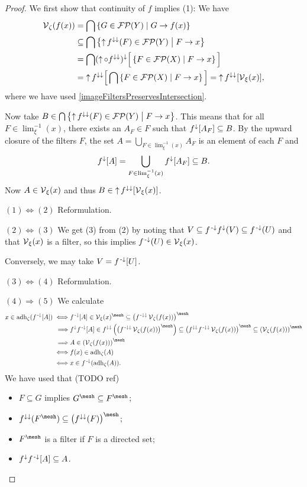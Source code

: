 \begin{proof}
We first show that continuity of $f$ implies (1): We have
\begin{align*}
\operatorname{\mathcal{V}}_\zeta(f(x)) &= \bigcap\left\{ G\in\operatorname{\mathcal{FP}}(Y) \;\middle|\; G\to f(x) \right\} \\
&\subseteq \bigcap\left\{ \operatorname{\uparrow} f^{\downarrow\downarrow}(F)\in\operatorname{\mathcal{FP}}(Y) \;\middle|\; F\to x \right\} \\
&= \bigcap (\operatorname{\uparrow}\circ f^{\downarrow\downarrow})^{\downarrow}\Big[\left\{ F\in\operatorname{\mathcal{FP}}(X) \;\middle|\; F\to x \right\}\Big] \\
&= \operatorname{\uparrow} f^{\downarrow\downarrow}\Big[\bigcap \left\{ F\in\operatorname{\mathcal{FP}}(X) \;\middle|\; F\to x \right\}\Big] = \operatorname{\uparrow} f^{\downarrow\downarrow}[\operatorname{\mathcal{V}}_\xi(x)],
\end{align*}
where we have used \ref{imageFiltersPreservesIntersection}.

Now take $B\in \bigcap\left\{ \operatorname{\uparrow} f^{\downarrow\downarrow}(F)\in\operatorname{\mathcal{FP}}(Y) \;\middle|\; F\to x \right\}$. This means that for all $F\in\lim^{-1}_\xi(x)$, there exists an $A_F\in F$ such that $f^\downarrow[A_F]\subseteq B$. By the upward closure of the filters $F$, the set $A = \bigcup_{F\in \lim^{-1}_\xi(x)}A_F$ is an element of each $F$ and
\[ f^\downarrow[A] = \bigcup_{F\in \lim^{-1}_\xi(x)}f^{\downarrow}[A_F] \subseteq B.  \]
Now $A\in \operatorname{\mathcal{V}}_\xi(x)$ and thus $B\in \operatorname{\uparrow} f^{\downarrow\downarrow}[\operatorname{\mathcal{V}}_\xi(x)]$.


$(1) \Leftrightarrow (2)$ Reformulation.

$(2) \Leftrightarrow (3)$ We get (3) from (2) by noting that $V\subseteq f^{{\text{\hspace{0.15em}-}\downarrow}}f^\downarrow(V) \subseteq f^{\text{\hspace{0.15em}-}\downarrow}(U)$ and that $\operatorname{\mathcal{V}}_\xi(x)$ is a filter, so this implies $f^{\text{\hspace{0.15em}-}\downarrow}(U)\in \operatorname{\mathcal{V}}_\xi(x)$.

Conversely, we may take $V = f^{{\text{\hspace{0.15em}-}\downarrow}}[U]$.

$(3) \Leftrightarrow (4)$ Reformulation.

$(4) \Rightarrow (5)$ We calculate
\begin{align*}
x\in \adh_\zeta(f^\preimf[A]) \iff& f^\preimf[A]\in \vicinity_\xi(x)^{\mesh} \subseteq \left(f^{\preimf\imf}\vicinity_\zeta(f(x))\right)^{\mesh} \\
\implies& f^\imf f^\preimf[A] \in f^{\imf\imf}\left(\left(f^{\preimf\imf}\vicinity_\zeta(f(x))\right)^{\mesh}\right) \subseteq \left(f^{\imf\imf} f^{\preimf\imf}\vicinity_\zeta(f(x))\right)^{\mesh} \subseteq \left(\vicinity_\zeta(f(x))\right)^{\mesh} \\
\implies& A \in \left(\vicinity_\zeta(f(x))\right)^{\mesh} \\
\iff& f(x)\in \adh_\zeta(A) \\
\iff& x\in f^{\preimf}(\adh_\zeta(A)).
\end{align*}
We have used that (TODO ref)
\begin{itemize}
\item $F\subseteq G$ implies $G^{\mesh} \subseteq F^{\mesh}$;
\item $f^{\imf\imf}(F^{\mesh}) \subseteq \left(f^{\imf\imf}(F)\right)^{\mesh}$;
\item $F^{\mesh}$ is a filter if $F$ is a directed set;
\item $f^\downarrow f^{\text{\hspace{0.15em}-}\downarrow}[A] \subseteq A$.
\end{itemize}


\end{proof}
